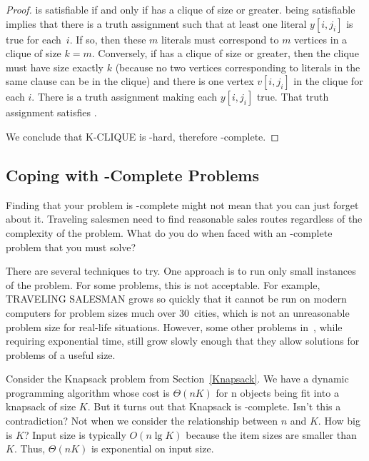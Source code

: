 \begin{example}
\begin{proof}
 is satisfiable if and only if  has a clique of size
 or greater.
 being satisfiable implies that there is a truth assignment
such that at least one literal \(y[i, j_i]\) is true for
each~\(i\).
If so, then these \(m\) literals must correspond to \(m\) vertices
in a clique of size \(k = m\).
Conversely, if  has a clique of size  or greater, then
the clique must have size exactly \(k\) (because no two vertices
corresponding to literals in the same clause can be in the clique) and
there is one vertex \(v[i, j_i]\) in the clique for each \(i\).
There is a truth assignment making each \(y[i, j_i]\) true.
That truth assignment satisfies .

We conclude that K-CLIQUE is \NP-hard, therefore
\NP-complete.
\end{proof}
\end{example}


\newpage

\subsection{Coping with \NP-Complete Problems}
\label{CopingNP}

Finding that your problem is \NP-complete might not mean
that you can just forget about it.
Traveling salesmen need to find reasonable sales routes regardless of
the complexity of the problem.
What do you do when faced with an \NP-complete problem that you must
solve?

There are several techniques to try.
One approach is to run only small instances of the problem.
For some problems, this is not acceptable.
For example, TRAVELING SALESMAN grows so quickly that it cannot be
run on modern computers for problem sizes much over 30~cities, which
is not an unreasonable problem size for real-life situations.
However, some other problems in~\NP, while requiring exponential
time, still grow slowly enough that they allow solutions for
problems of a useful size.

Consider the Knapsack problem from Section~\ref{Knapsack}.
We have a dynamic programming algorithm whose cost is
\(\Theta(nK)\) for n objects being fit into a knapsack of size \(K\).
But it turns out that Knapsack is \NP-complete.
Isn't this a contradiction?
Not when we consider the relationship between \(n\) and \(K\).
How big is \(K\)?
Input size is typically \(O(n \lg K)\) because the item sizes are
smaller than \(K\).
Thus, \(\Theta(nK)\) is exponential on input size.

